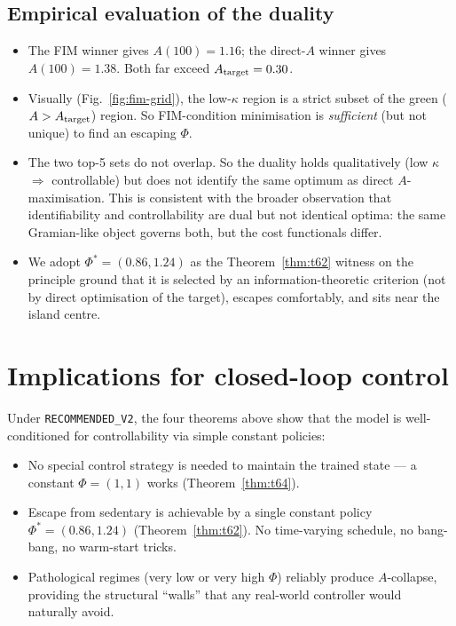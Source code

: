 \documentclass[11pt,a4paper]{article}
\theoremstyle{definition}
\begin{document}
\subsection{Empirical evaluation of the duality}

\begin{itemize}
  \item The FIM winner gives $A(100) = 1.16$; the direct-$A$ winner gives $A(100) = 1.38$. Both far exceed $A_{\rm target} = 0.30$.
  \item Visually (Fig.~\ref{fig:fim-grid}), the low-$\kappa$ region is a strict subset of the green ($A > A_{\rm target}$) region. So FIM-condition minimisation is \emph{sufficient} (but not unique) to find an escaping $\Phi$.
  \item The two top-5 sets do not overlap. So the duality holds qualitatively (low $\kappa$ $\Rightarrow$ controllable) but does not identify the same optimum as direct $A$-maximisation. This is consistent with the broader observation that identifiability and controllability are dual but not identical optima: the same Gramian-like object governs both, but the cost functionals differ.
  \item We adopt $\Phi^* = (0.86, 1.24)$ as the Theorem~\ref{thm:t62} witness on the principle ground that it is selected by an information-theoretic criterion (not by direct optimisation of the target), escapes comfortably, and sits near the island centre.
\end{itemize}

\section{Implications for closed-loop control} \label{sec:closed-loop}

Under \texttt{RECOMMENDED\_V2}, the four theorems above show that the model is well-conditioned for controllability via simple constant policies:

\begin{itemize}
  \item No special control strategy is needed to maintain the trained state — a constant $\Phi = (1, 1)$ works (Theorem~\ref{thm:t64}).
  \item Escape from sedentary is achievable by a single constant policy $\Phi^* = (0.86, 1.24)$ (Theorem~\ref{thm:t62}). No time-varying schedule, no bang-bang, no warm-start tricks.
  \item Pathological regimes (very low or very high $\Phi$) reliably produce $A$-collapse, providing the structural ``walls'' that any real-world controller would naturally avoid.
\end{itemize}
\end{document}
